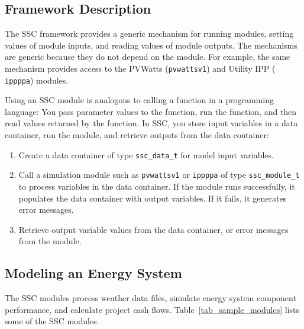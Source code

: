 \documentclass{article}
\begin{document}
\subsection{Framework Description}

The SSC framework provides a generic mechanism for running modules, setting values of module inputs, and reading values of module outputs. The mechanisms are generic because they do not depend on the module. For example, the same mechanism provides access to the PVWatts (\texttt{pvwattsv1}) and Utility IPP ( \texttt{ippppa}) modules.  

Using an SSC module is analogous to calling a function in a programming language: You pass parameter values to the function, run the function, and then read values returned by the function.  In SSC, you store input variables in a data container, run the module, and retrieve outputs from the data container:

\begin{enumerate}
\item Create a data container of type \texttt{ssc\_data\_t} for model input variables.
\item Call a simulation module such as \texttt{pvwattsv1} or \texttt{ippppa} of type \texttt{ssc\_module\_t} to process variables in the data container. If the module runs successfully, it populates the data container with output variables. If it fails, it generates error messages.
\item Retrieve output variable values from the data container, or error messages from the module.
\end{enumerate}

\subsection{Modeling an Energy System}
\label{sec_modeling_systems}
The SSC modules process weather data files, simulate energy system component performance, and calculate project cash flows. Table~\ref{tab_sample_modules} lists some of the SSC modules.
\end{document}
